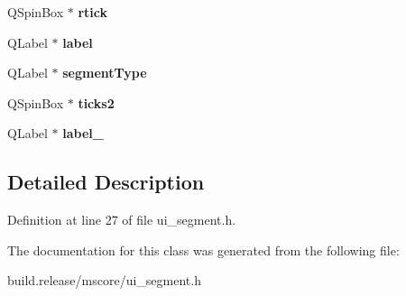 \begin{DoxyCompactItemize}
\mbox{\label{class_ui___segment_base_aa19c90c73a430aa55f3a582dac5c9152}} 
Q\+Spin\+Box $\ast$ {\bfseries rtick}
\item 
\mbox{\label{class_ui___segment_base_ace647d63c0ae6938213d80380f81d1aa}} 
Q\+Label $\ast$ {\bfseries label}
\item 
\mbox{\label{class_ui___segment_base_a1b0c098de7ab4af40e02f7ddf4dba202}} 
Q\+Label $\ast$ {\bfseries segment\+Type}
\item 
\mbox{\label{class_ui___segment_base_a32c5c451433f9a71e7d671085d5be9af}} 
Q\+Spin\+Box $\ast$ {\bfseries ticks2}
\item 
\mbox{\label{class_ui___segment_base_a18e341593d81d4c17e2316d668b46929}} 
Q\+Label $\ast$ {\bfseries label\+\_}
\end{DoxyCompactItemize}


\subsection{Detailed Description}


Definition at line 27 of file ui\+\_\+segment.\+h.



The documentation for this class was generated from the following file\+:\begin{DoxyCompactItemize}
\item 
build.\+release/mscore/ui\+\_\+segment.\+h\end{DoxyCompactItemize}
